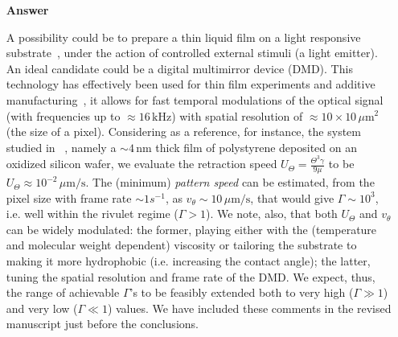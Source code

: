 \documentclass[12pt,english]{article}
\newcommand{\JH}[1]{\textcolor{blue}{JH: #1}}
\begin{document}
\begin{itemize}
\item[ \textbf{{Answer}}]
{
A possibility could be to prepare a thin liquid film on a light responsive substrate~\cite{IchimuraEtAl_Science2000}, under the action of controlled 
external stimuli (a light emitter). 
An ideal candidate could be a digital multimirror device (DMD).
This technology has effectively been used for thin film experiments and additive manufacturing~\cite{doi:10.1021/jp301092y, doi:10.1126/science.aax8760}, it allows for fast temporal modulations of the optical signal (with frequencies up to $\approx 16 \, \text{kHz}$)
with spatial resolution of $\approx 10 \times 10 \, \mu \text{m}^2$ (the size of a pixel).
Considering as a reference, for instance, the system studied in ~\cite{becker2003complex,PhysRevLett.99.114503}, namely a $\sim 4 \, \text{nm}$ thick film 
of polystyrene deposited on an oxidized silicon wafer,  
we evaluate the retraction speed 
$U_{\Theta} = \frac{\Theta^3 \gamma}{9 \mu}$ to be 
$U_{\Theta} \approx 10^{-2} \, \mu \text{m}/\text{s}$. 
The (minimum) {\it pattern speed} can be 
estimated, from the pixel size with frame rate $\sim 1 s^{-1}$, as 
$v_{\theta} \sim 10 \, \mu \text{m}/\text{s}$, that would give $\Gamma \sim 10^3$, i.e. well within 
the rivulet regime ($\Gamma > 1$). We note, also, that both $U_{\Theta}$ and $v_{\theta}$ can 
be widely modulated: the former, playing either with the (temperature and molecular weight dependent) viscosity 
or tailoring the substrate to making it more hydrophobic (i.e. increasing the contact angle); the latter, tuning
the spatial resolution and frame rate of the DMD. We expect, thus, the range of achievable $\Gamma$'s to 
be feasibly extended both to very high ($\Gamma \gg 1$) and very low ($\Gamma \ll 1$) values. 
We have included these comments in the revised manuscript just before the conclusions.

}
\end{itemize}
\end{document}
